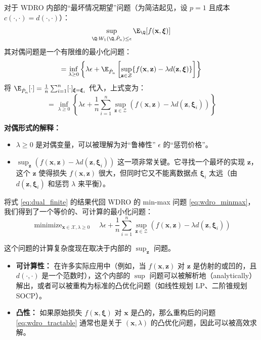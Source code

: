 \documentclass[lang=cn,newtx,10pt,scheme=chinese,chinesefont=nofont,citestyle=gb7714-2015, bibstyle=gb7714-2015]{elegantbook}
\DeclareMathOperator*{\minimize}{minimize}
\newcommand{\bx}{\mathbf{x}} %
\newcommand{\bxi}{\boldsymbol{\xi}} %
\newcommand{\Xcal}{\mathcal{X}} %
\newcommand{\Zcal}{\mathcal{Z}} %
\newcommand{\Phat}{\hat{P}_n} %
\begin{document}
\begin{refsection}
\begin{theorem}
对于 WDRO 内部的“最坏情况期望”问题（为简洁起见，设 $p=1$ 且成本 $c(\cdot, \cdot) = d(\cdot, \cdot)$）：
\begin{equation}
\label{eq:inner_sup}
\sup_{\Q : W_1(\Q, \Phat) \le \epsilon} \E_{\Q}[f(\bx, \bxi)]
\end{equation}
其对偶问题是一个有限维的最小化问题：
\begin{equation}
\label{eq:dual_inf}
= \inf_{\lambda \ge 0} \left\{ \lambda \epsilon + \E_{\Phat}\left[ \sup_{\mathbf{z} \in \Zcal} \{ f(\bx, \mathbf{z}) - \lambda d(\mathbf{z}, \bxi) \} \right] \right\}
\end{equation}
将 $\E_{\Phat}[\cdot] = \frac{1}{n} \sum_{i=1}^n [\cdot]_{\bxi = \bxi_i}$ 代入，上式变为：
\begin{equation}
\label{eq:dual_finite}
= \inf_{\lambda \ge 0} \left\{ \lambda \epsilon + \frac{1}{n} \sum_{i=1}^n \sup_{\mathbf{z} \in \Zcal} \left( f(\bx, \mathbf{z}) - \lambda d(\mathbf{z}, \bxi_i) \right) \right\}
\end{equation}
\end{theorem}

\noindent
\textbf{对偶形式的解释：}
\begin{itemize}
    \item $\lambda \ge 0$ 是对偶变量，可以被理解为对“鲁棒性” $\epsilon$ 的“惩罚价格”。
    \item $\sup_{\mathbf{z}} ( f(\bx, \mathbf{z}) - \lambda d(\mathbf{z}, \bxi_i) )$ 这一项非常关键。它寻找一个最坏的实现 $\mathbf{z}$，这个 $\mathbf{z}$ 使得损失 $f(\bx, \mathbf{z})$ 很大，但同时它又不能离数据点 $\bxi_i$ 太远（由 $d(\mathbf{z}, \bxi_i)$ 和惩罚 $\lambda$ 来平衡）。
\end{itemize}

将式 \eqref{eq:dual_finite} 的结果代回 WDRO 的 min-max 问题 \eqref{eq:wdro_minmax}，我们得到了一个等价的、可计算的最小化问题：
\begin{equation}
\label{eq:wdro_tractable}
\minimize_{\bx \in \Xcal, \lambda \ge 0} \quad \lambda \epsilon + \frac{1}{n} \sum_{i=1}^n \sup_{\mathbf{z} \in \Zcal} \left( f(\bx, \mathbf{z}) - \lambda d(\mathbf{z}, \bxi_i) \right)
\end{equation}

\noindent
这个问题的计算复杂度现在取决于内部的 $\sup_{\mathbf{z}}$ 问题。
\begin{itemize}
    \item \textbf{可计算性：} 在许多实际应用中（例如，当 $f(\bx, \mathbf{z})$ 对 $\mathbf{z}$ 是仿射的或凹的，且 $d(\cdot, \cdot)$ 是一个范数时），这个内部的 $\sup$ 问题可以被解析地（analytically）解出，或者可以被重构为标准的凸优化问题（如线性规划 LP、二阶锥规划 SOCP）。
    \item \textbf{凸性：} 如果原始损失 $f(\bx, \bxi)$ 对 $\bx$ 是凸的，那么重构后的问题 \eqref{eq:wdro_tractable} 通常也是关于 $(\bx, \lambda)$ 的凸优化问题，因此可以被高效求解。
\end{itemize}


\end{refsection}
\end{document}
